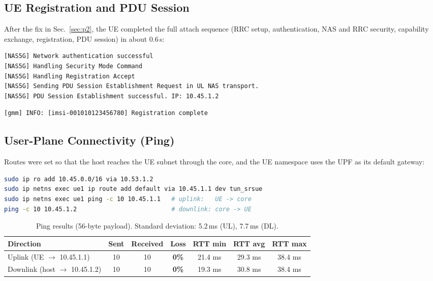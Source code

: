 \documentclass[11pt,a4paper]{article}
\begin{document}
\subsection{UE Registration and PDU Session}

After the fix in Sec.~\ref{sec:p2}, the UE completed the full attach sequence
(RRC setup, authentication, NAS and RRC security, capability exchange,
registration, PDU session) in about 0.6\,s:
\begin{lstlisting}
[NAS5G] Network authentication successful
[NAS5G] Handling Security Mode Command
[NAS5G] Handling Registration Accept
[NAS5G] Sending PDU Session Establishment Request in UL NAS transport.
[NAS5G] PDU Session Establishment successful. IP: 10.45.1.2
\end{lstlisting}
\begin{lstlisting}
[gmm] INFO: [imsi-001010123456780] Registration complete
\end{lstlisting}

\subsection{User-Plane Connectivity (Ping)}

Routes were set so that the host reaches the UE subnet through the core, and
the UE namespace uses the UPF as its default gateway:
\begin{lstlisting}[language=bash]
sudo ip ro add 10.45.0.0/16 via 10.53.1.2
sudo ip netns exec ue1 ip route add default via 10.45.1.1 dev tun_srsue
sudo ip netns exec ue1 ping -c 10 10.45.1.1   # uplink:   UE -> core
ping -c 10 10.45.1.2                          # downlink: core -> UE
\end{lstlisting}

\begin{table}[H]
\centering
\begin{tabular}{l c c c c c c}
\toprule
Direction & Sent & Received & Loss & RTT min & RTT avg & RTT max \\
\midrule
Uplink (UE $\rightarrow$ 10.45.1.1)   & 10 & 10 & \textbf{0\%} & 21.4 ms & 29.3 ms & 38.4 ms \\
Downlink (host $\rightarrow$ 10.45.1.2) & 10 & 10 & \textbf{0\%} & 19.3 ms & 30.8 ms & 38.4 ms \\
\bottomrule
\end{tabular}
\caption{Ping results (56-byte payload). Standard deviation: 5.2\,ms (UL), 7.7\,ms (DL).}
\end{table}
\end{document}
